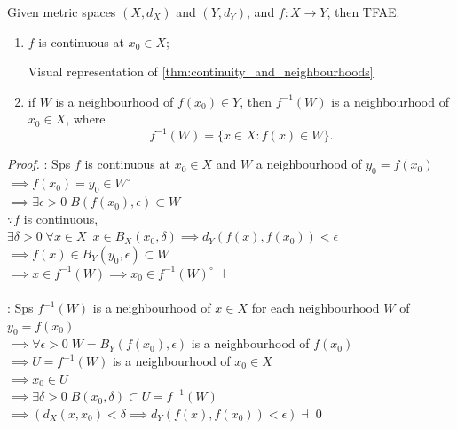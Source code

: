 \documentclass[notoc,notitlepage]{tufte-book}
\begin{document}
\begin{thm}\label{thm:continuity_and_neighbourhoods}
  Given metric spaces $(X, d_X)$ and $(Y, d_Y)$, and $f : X \to Y$, then TFAE:
  \begin{enumerate}
    \item $f$ is continuous at $x_0 \in X$;
      \begin{marginfigure}
        \centering
        \caption{Visual representation of \cref{thm:continuity_and_neighbourhoods}}\label{fig:visual_representation_of_continuity_and_neighbourhoods}
      \end{marginfigure}
    \item if $W$ is a neighbourhood of $f(x_0) \in Y$, then $f^{-1}(W)$ is a neighbourhood of $x_0 \in X$, where
      \begin{equation*}
        f^{-1}(W) = \{ x \in X : f(x) \in W \}.
      \end{equation*}
  \end{enumerate}
\end{thm}

\begin{proof}
   : Sps $f$ is continuous at $x_0 \in X$ and $W$ a neighbourhood of $y_0 = f(x_0)$ \\
  $\implies f(x_0) = y_0 \in W^\circ$ \\
  $\implies \exists \epsilon > 0 \; B(f(x_0), \epsilon) \subset W$ \\
  $\because f$ is continuous, \\
  $\exists \delta > 0 \; \forall x \in X \enspace x \in B_X(x_0, \delta) \implies d_Y( f(x ), f(x_0) ) < \epsilon$ \\
  $\implies f(x) \in B_Y(y_0, \epsilon) \subset W$ \\
  $\implies x \in f^{-1}(W) \implies x_0 \in f^{-1}(W)^\circ \dashv$ \\
  $ $ \\
  \noindent{} : Sps $f^{-1}(W)$ is a neighbourhood of $x \in X$ for each neighbourhood $W$ of $y_0 = f(x_0)$ \\
  $\implies \forall \epsilon > 0 \; W = B_Y(f(x_0), \epsilon)$ is a neighbourhood of $f(x_0)$ \\
  $\implies U = f^{-1}(W)$ is a neighbourhood of $x_0 \in X$ \\
  $\implies x_0 \in U$ \\
  $\implies \exists \delta > 0 \; B(x_0, \delta) \subset U = f^{-1}(W)$ \\
  $\implies ( d_X(x, x_0) < \delta \implies d_Y( f(x), f(x_0) ) < \epsilon ) \dashv$\qed\
\end{proof}
\end{document}
